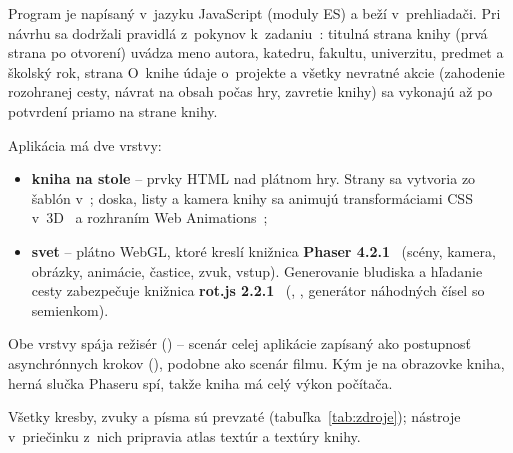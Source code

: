 \documentclass[11pt, a4paper]{article}
\begin{document}
Program je napísaný v~jazyku JavaScript (moduly ES) a beží v~prehliadači. Pri návrhu sa dodržali
pravidlá z~pokynov k~zadaniu~\cite{Pokyny}: titulná strana knihy (prvá strana po otvorení) uvádza
meno autora, katedru, fakultu, univerzitu, predmet a školský rok, strana O~knihe údaje o~projekte
a všetky nevratné akcie (zahodenie rozohranej cesty, návrat na obsah počas hry, zavretie knihy)
sa vykonajú až po potvrdení priamo na strane knihy.

Aplikácia má dve vrstvy:
\begin{itemize}
  \item \textbf{kniha na stole} – prvky HTML nad plátnom hry. Strany sa vytvoria zo šablón
     v~; doska, listy a kamera knihy sa animujú transformáciami
    CSS v~3D~\cite{MdnTransforms} a rozhraním Web Animations~\cite{MdnWaapi};
  \item \textbf{svet} – plátno WebGL, ktoré kreslí knižnica \textbf{Phaser 4.2.1}~\cite{Phaser}
    (scény, kamera, obrázky, animácie, častice, zvuk, vstup). Generovanie bludiska a hľadanie cesty
    zabezpečuje knižnica \textbf{rot.js 2.2.1}~\cite{RotJs} (,
    , generátor náhodných čísel so semienkom).
\end{itemize}
Obe vrstvy spája režisér () – scenár celej aplikácie zapísaný ako postupnosť
asynchrónnych krokov (), podobne ako scenár filmu. Kým je na obrazovke kniha,
herná slučka Phaseru spí, takže kniha má celý výkon počítača.

Všetky kresby, zvuky a písma sú prevzaté (tabuľka~\ref{tab:zdroje}); nástroje v~priečinku
 z~nich pripravia atlas textúr a textúry knihy.
\end{document}
